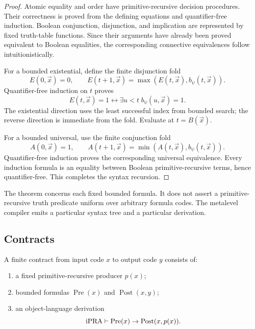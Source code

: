 \begin{proof}
Atomic equality and order have primitive-recursive decision procedures.  Their correctness is proved from the defining equations and quantifier-free induction.  Boolean conjunction, disjunction, and implication are represented by fixed truth-table functions.  Since their arguments have already been proved equivalent to Boolean equalities, the corresponding connective equivalences follow intuitionistically.

For a bounded existential, define the finite disjunction fold
\[
  E(0,\vec x)=0,
  \qquad
  E(t+1,\vec x)=\max(E(t,\vec x),b_{\psi}(t,\vec x)).
\]
Quantifier-free induction on $t$ proves
\[
  E(t,\vec x)=1
  \leftrightarrow
  \exists u<t\; b_{\psi}(u,\vec x)=1.
\]
The existential direction uses the least successful index from bounded search; the reverse direction is immediate from the fold.  Evaluate at $t=B(\vec x)$.

For a bounded universal, use the finite conjunction fold
\[
  A(0,\vec x)=1,
  \qquad
  A(t+1,\vec x)=\min(A(t,\vec x),b_{\psi}(t,\vec x)).
\]
Quantifier-free induction proves the corresponding universal equivalence.  Every induction formula is an equality between Boolean primitive-recursive terms, hence quantifier-free.  This completes the syntax recursion.
\end{proof}

\begin{remark}
The theorem concerns each fixed bounded formula.  It does not assert a primitive-recursive truth predicate uniform over arbitrary formula codes.  The metalevel compiler emits a particular  syntax tree and a particular derivation.
\end{remark}

\subsection{Contracts}

\begin{definition}
A finite contract from input code $x$ to output code $y$ consists of:
\begin{enumerate}
  \item a fixed primitive-recursive producer $p(x)$;
  \item bounded formulas $\operatorname{Pre}(x)$ and $\operatorname{Post}(x,y)$;
  \item an object-language derivation
  \[
    \mathrm{iPRA}\vdash
    \operatorname{Pre}(x)\to\operatorname{Post}(x,p(x)).
  \]
\end{enumerate}
\end{definition}

